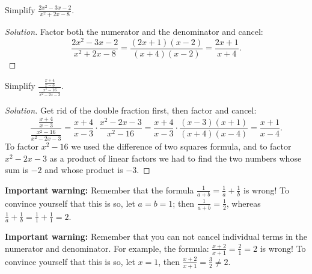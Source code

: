 \documentclass{ximera}
\begin{document}
\begin{example}
Simplify $\displaystyle \frac{2x^2-3x-2}{x^2+2x-8}$.
\end{example}
\begin{proof}[Solution]
Factor both the numerator and the denominator and cancel:
\[ \frac{2x^2-3x-2}{x^2+2x-8} = \frac{(2x+1)(x-2)}{(x+4)(x-2)} = \frac{2x+1}{x+4}.\]
\end{proof}

\begin{example}
Simplify $\displaystyle \frac{\frac{x+4}{x-3}}{\frac{x^2-16}{x^2-2x-3}}$.
\end{example}
\begin{proof}[Solution]
Get rid of the double fraction first, then factor and cancel:
\[ \frac{\frac{x+4}{x-3}}{\frac{x^2-16}{x^2-2x-3}} = \frac{x+4}{x-3} \cdot \frac{x^2-2x-3}{x^2-16} = \frac{x+4}{x-3} \cdot \frac{(x-3)(x+1)}{(x+4)(x-4)} = \frac{x+1}{x-4}.\]
To factor $x^2-16$ we used the difference of two squares formula, and to factor $x^2-2x-3$ as a product of linear factors we had to find the two numbers whose sum is $-2$
and whose product is $-3$.
\end{proof}

{\bf Important warning:} Remember that the formula $\frac{1}{a+b} = \frac{1}{a} + \frac{1}{b}$ is wrong!  To convince yourself that this is so, let $a = b = 1$; then $\frac{1}{a+b}=\frac{1}{2}$, whereas $\frac{1}{a}+\frac{1}{b} = \frac{1}{1}+\frac{1}{1} = 2$.

{\bf Important warning:} Remember that you can not cancel individual terms in the numerator and denominator. For example, the formula: $\frac{x+2}{x+1}=\frac{2}{1}=2$ is wrong! To convince yourself that this is so, let $x=1$, then $\frac{x+2}{x+1}=\frac{3}{2}\neq 2$.
\end{document}
